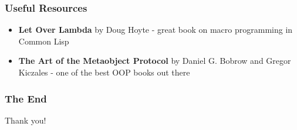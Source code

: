 \documentclass{beamer}
\begin{document}
\begin{frame}
  \frametitle{Useful Resources}
  \begin{itemize}
  \item \textbf{Let Over Lambda} by Doug Hoyte - great book on macro programming
    in Common Lisp
  \item \textbf{The Art of the Metaobject Protocol} by Daniel G. Bobrow and
    Gregor Kiczales - one of the best OOP books out there
  \end{itemize}
\end{frame}

\begin{frame}
  \frametitle{The End}
  \begin{center}
    Thank you!
  \end{center}
\end{frame}
\end{document}
